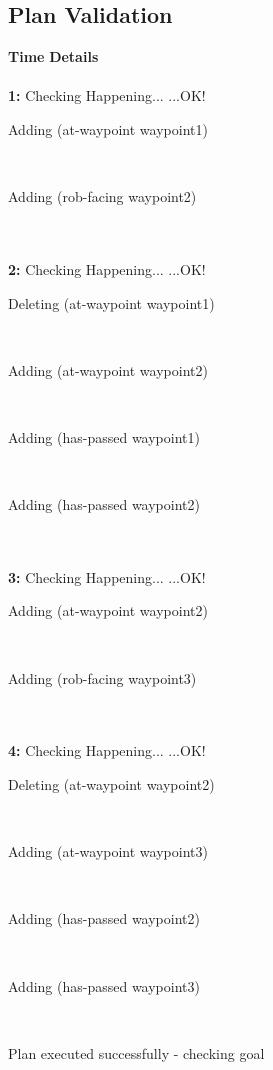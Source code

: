 \documentclass[a4paper,12pt]{article}
\newcommand{\headingtimedetails}{{\bf Time} \qquad \= {\bf Details}\\[0.8ex]}
\newcommand{\atime}[1]{{\bf #1:}}
\newcommand{\exprn}[1]{{\sf #1}}
\newcommand{\checkhappening}{Checking Happening... }
\newcommand{\listrow}[1]{\begin{minipage}[t]{11.5cm} #1 \end{minipage}}
\newcommand{\happeningOK}{...OK!}
\newcommand{\adding}[1]{\listrow{Adding \exprn{#1} }}
\newcommand{\deleting}[1]{\listrow{Deleting \exprn{#1} }}
\begin{document}
\subsection{Plan Validation}
\begin{tabbing}
\headingtimedetails 
\\
\atime{1} \> \checkhappening\happeningOK\\
 \> \adding{(at-waypoint waypoint1)}\\
 \> \adding{(rob-facing waypoint2)}\\
\\
\atime{2} \> \checkhappening\happeningOK\\
 \> \deleting{(at-waypoint waypoint1)}\\
 \> \adding{(at-waypoint waypoint2)}\\
 \> \adding{(has-passed waypoint1)}\\
 \> \adding{(has-passed waypoint2)}\\
\\
\atime{3} \> \checkhappening\happeningOK\\
 \> \adding{(at-waypoint waypoint2)}\\
 \> \adding{(rob-facing waypoint3)}\\
\\
\atime{4} \> \checkhappening\happeningOK\\
 \> \deleting{(at-waypoint waypoint2)}\\
 \> \adding{(at-waypoint waypoint3)}\\
 \> \adding{(has-passed waypoint2)}\\
 \> \adding{(has-passed waypoint3)}\\
\end{tabbing}
Plan executed successfully - checking goal\\
\\
\end{document}
